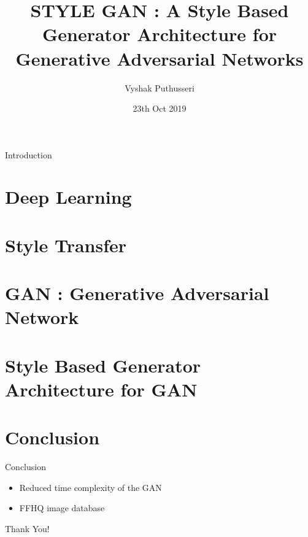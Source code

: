 \documentclass{beamer}
\author{Vyshak Puthusseri}
\date{23th Oct 2019}
\institute[CET]
{
College of Engineering, Trivandrum\\\\
\text{TVE17MCA054}
}
\title{STYLE GAN : A Style Based Generator Architecture for Generative Adversarial Networks}
\begin{document}
\titlepage 
\begin{frame}
    {Introduction}
    \tableofcontents   
\end{frame}

\section{Deep Learning}
\section{Style Transfer}
\section{GAN : Generative Adversarial Network}
\section{Style Based Generator Architecture for GAN}







\section{Conclusion}
\begin{frame}{Conclusion}
    \begin{itemize}
        \item Reduced time complexity of the GAN 
        \item FFHQ image database
    
    \end{itemize}
\end{frame}
\begin{frame}%
\begin{center}
\Huge Thank You!
\end{center}
\end{frame}
\end{document}
